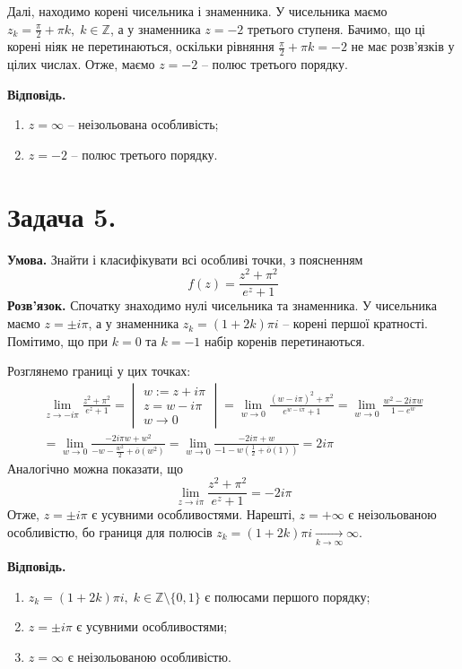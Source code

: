 \documentclass[14pt]{extarticle}
\begin{document}
Далі, находимо корені чисельника і знаменника. У чисельника маємо $z_k=\frac{\pi}{2}+\pi k, \; k \in \mathbb{Z}$, а у знаменника $z=-2$ третього ступеня. Бачимо, що ці корені ніяк не перетинаються, оскільки рівняння $\frac{\pi}{2}+\pi k = -2$ не має розв'язків у цілих числах. Отже, маємо $z=-2$ -- полюс третього порядку. 

\textbf{Відповідь.}
\begin{enumerate}
    \item $z=\infty$ -- неізольована особливість;
    \item $z=-2$ -- полюс третього порядку.
\end{enumerate}

\pagebreak

\section*{Задача 5.} 

\textbf{Умова.} Знайти і класифікувати всі особливі точки, з поясненням
\[
f(z) = \frac{z^2+\pi^2}{e^z+1}
\]
\textbf{Розв'язок.} Спочатку знаходимо нулі чисельника та знаменника. У чисельника маємо $z=\pm i\pi$, а у знаменника $z_k=(1+2k)\pi i$ -- корені першої кратності. Помітимо, що при $k=0$ та $k=-1$ набір коренів перетинаються. 

Розглянемо границі у цих точках:
\begin{gather*}
\lim_{z \to -i\pi} \frac{z^2+\pi^2}{e^z+1} = \begin{vmatrix}
    w := z + i\pi \\
    z = w - i\pi \\
    w \to 0
\end{vmatrix} = \lim_{w \to 0} \frac{(w-i\pi)^2 + \pi^2}{e^{w-i\pi}+1} = \lim_{w \to 0} \frac{w^2-2i \pi w}{1 - e^{w}} \\
= \lim_{w \to 0} \frac{-2i\pi w+w^2}{-w - \frac{w^2}{2} + \overline{o}(w^2)} = \lim_{w \to 0} \frac{-2i \pi + w}{-1 - w(\frac{1}{2}+\overline{o}(1))} = 2i \pi
\end{gather*}
Аналогічно можна показати, що
\[
\lim_{z \to i \pi} \frac{z^2+\pi^2}{e^z+1} = -2i \pi 
\]
Отже, $z=\pm i \pi$ є усувними особливостями. Нарешті, $z=+\infty$ є неізольованою особливістю, бо границя для полюсів $z_k = (1+2k)\pi i \xrightarrow[k \to \infty]{} \infty$. 

\textbf{Відповідь.}
\begin{enumerate}
    \item $z_k=(1+2k)\pi i, \; k \in \mathbb{Z} \setminus \{0,1\}$ є полюсами першого порядку;
    \item $z=\pm i \pi$ є усувними особливостями;
    \item $z=\infty$ є неізольованою особливістю.
\end{enumerate}
\end{document}
